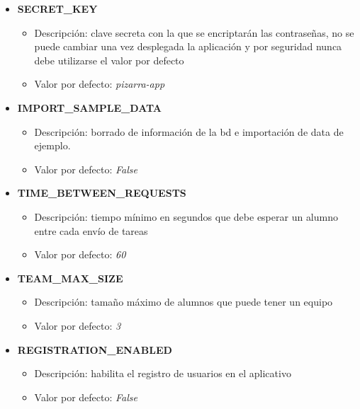 \documentclass[11pt,spanish,listoffigures,listoftables]{tfgetsinf}
\begin{document}
\begin{itemize}
	\item \textbf{SECRET\_KEY}
	\begin{itemize}
		\item Descripción: clave secreta con la que se encriptarán las contraseñas, no se puede cambiar una vez desplegada la aplicación y por seguridad nunca debe utilizarse el valor por defecto
		\item Valor por defecto: \textit{pizarra-app}
	\end{itemize}
\end{itemize}

\begin{itemize}
	\item \textbf{IMPORT\_SAMPLE\_DATA}
	\begin{itemize}
		\item Descripción: borrado de información de la \acrlong{bd} e importación de data de ejemplo.
		\item Valor por defecto: \textit{False}
	\end{itemize}
\end{itemize}

\begin{itemize}
	\item \textbf{TIME\_BETWEEN\_REQUESTS}
	\begin{itemize}
		\item Descripción: tiempo mínimo en segundos que debe esperar un \Gls{alumno} entre cada envío de \Gls{tarea}s
		\item Valor por defecto: \textit{60}
	\end{itemize}
\end{itemize}

\begin{itemize}
	\item \textbf{TEAM\_MAX\_SIZE}
	\begin{itemize}
		\item Descripción: tamaño máximo de \Gls{alumno}s que puede tener un \Gls{equipo}
		\item Valor por defecto: \textit{3}
	\end{itemize}
\end{itemize}

\begin{itemize}
	\item \textbf{REGISTRATION\_ENABLED}
	\begin{itemize}
		\item Descripción: habilita el registro de usuarios en el aplicativo
		\item Valor por defecto: \textit{False}
	\end{itemize}
\end{itemize}
\end{document}
